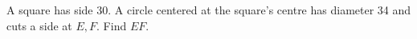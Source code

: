 A square has side 30. A circle centered at the square's centre has diameter 34 and cuts a side at $E,F$. Find $EF$.
